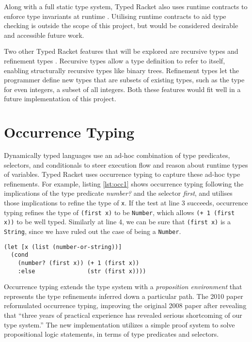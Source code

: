 Along with a full static type system, Typed Racket 
also uses runtime contracts to enforce type invariants at runtime \cite{Tobin-Hochstadt:2008:DIT:1328897.1328486}.
Utilising runtime contracts to aid type checking is outside the scope of this project, but would be 
considered desirable and accessible future work.

Two other Typed Racket features that will be explored are recursive types and refinement types  
\cite{SAMTH:dissertation}. Recursive types allow a type definition to refer to itself, enabling structurally
recursive types like binary trees. Refinement types let the programmer define
new types that are subsets of existing types, such as the type for even integers, a subset of all integers.
Both these features would fit well in a future implementation of this project.

\section{Occurrence Typing}
\label{sec:OccurrenceTyping}

Dynamically typed languages use an ad-hoc combination of type predicates,
selectors, and conditionals to steer execution flow and reason about runtime types of variables.
Typed Racket uses occurrence typing to capture these ad-hoc type refinements.
For example, listing \ref{lst:occ1} shows occurrence typing following the implications 
of the type predicate \emph{number?} and the selector \emph{first}, and utilises those implications to refine
the type of \lstinline|x|. If the test at line 3 succeeds, occurrence typing refines the
type of \lstinline|(first x)| to be \lstinline|Number|, which allows \lstinline|(+ 1 (first x))|
to be well typed. Similarly at line 4, we can be sure that \lstinline|(first x)| is
a \lstinline|String|, since we have ruled out the case of being a \lstinline|Number|.

\begin{lstlisting}[caption=A well typed form utilising occurrence typing with Clojure syntax, label=lst:occ1]
(let [x (list (number-or-string))]
  (cond 
    (number? (first x)) (+ 1 (first x))
    :else               (str (first x))))
\end{lstlisting}

Occurrence typing \cite{Tobin-Hochstadt:2008:DIT:1328897.1328486}
\cite{Tobin-Hochstadt:2010:LTU:1932681.1863561} extends the type 
system with a \emph{proposition environment} that represents 
the type refinements inferred down a particular path.
The 2010 paper \cite{Tobin-Hochstadt:2010:LTU:1932681.1863561}
reformulated occurrence typing, improving the original 2008 paper
\cite{Tobin-Hochstadt:2008:DIT:1328897.1328486}
after revealing that ``three years of practical experience has revealed
serious shortcoming of our type system.''\cite{Tobin-Hochstadt:2010:LTU:1932681.1863561}
The new implementation utilizes a simple proof system to solve
propositional logic statements, in terms of type predicates and selectors.

